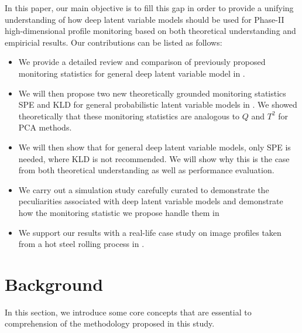 \documentclass[journal, peerreview]{IEEEtran}
\newcommand{\hao}[1]{\todo[color=orange,inline]{Hao: #1}}
\newcommand{\dorukhan}[1]{\todo[color=green,inline]{dorukhan: #1}}
\begin{document}
In this paper, our main objective is to fill this gap in order to provide a unifying understanding of how deep latent variable models  should be used for Phase-II high-dimensional profile monitoring based on both theoretical understanding and empiricial results.
Our contributions can be listed as follows:
\begin{itemize}
    \item We provide a detailed review and comparison of previously proposed monitoring statistics for general deep latent variable model \cite{wang2019systematic, Zhang2019-lu, lee2019process} in .
    \item We will then propose two new theoretically grounded monitoring statistics SPE and KLD for general probabilistic latent variable models in . We showed theoretically that these monitoring statistics are analogous to $Q$ and $T^2$ for PCA methods. 
    \item We will then show that for general deep latent variable models, only SPE is needed, where KLD is not recommended. We will show why this is the case from both theoretical understanding as well as performance evaluation. 
    \item We carry out a simulation study carefully curated to demonstrate the peculiarities associated with deep latent variable models and demonstrate how the monitoring statistic we propose handle them in 
    \item We support our results with a real-life case study on image profiles taken from a hot steel rolling process in .
\end{itemize}

\section{Background}
\label{sec:bckgrnd}
In this section, we introduce some core concepts that are essential to comprehension of the methodology proposed in this study.
\end{document}

